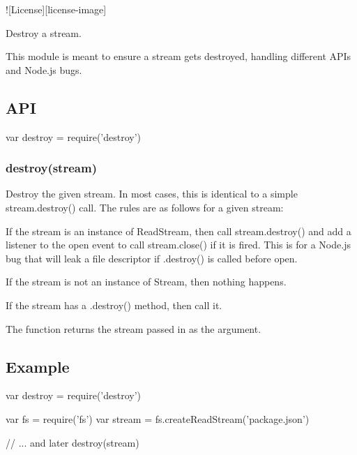 \href{https://npmjs.org/package/destroy}{\tt } \href{https://travis-ci.org/stream-utils/destroy}{\tt } \href{https://coveralls.io/r/stream-utils/destroy?branch=master}{\tt } !\mbox{[}License\mbox{]}\mbox{[}license-\/image\mbox{]} \href{https://npmjs.org/package/destroy}{\tt } \href{https://www.gittip.com/jonathanong/}{\tt }

Destroy a stream.

This module is meant to ensure a stream gets destroyed, handling different A\+P\+Is and Node.\+js bugs.

\subsection*{A\+PI}


\begin{DoxyCode}
var destroy = require('destroy')
\end{DoxyCode}


\subsubsection*{destroy(stream)}

Destroy the given stream. In most cases, this is identical to a simple {\ttfamily stream.\+destroy()} call. The rules are as follows for a given stream\+:


\begin{DoxyEnumerate}
\item If the {\ttfamily stream} is an instance of {\ttfamily Read\+Stream}, then call {\ttfamily stream.\+destroy()} and add a listener to the {\ttfamily open} event to call {\ttfamily stream.\+close()} if it is fired. This is for a Node.\+js bug that will leak a file descriptor if {\ttfamily .destroy()} is called before {\ttfamily open}.
\item If the {\ttfamily stream} is not an instance of {\ttfamily Stream}, then nothing happens.
\item If the {\ttfamily stream} has a {\ttfamily .destroy()} method, then call it.
\end{DoxyEnumerate}

The function returns the {\ttfamily stream} passed in as the argument.

\subsection*{Example}


\begin{DoxyCode}
var destroy = require('destroy')

var fs = require('fs')
var stream = fs.createReadStream('package.json')

// ... and later
destroy(stream)
\end{DoxyCode}
 